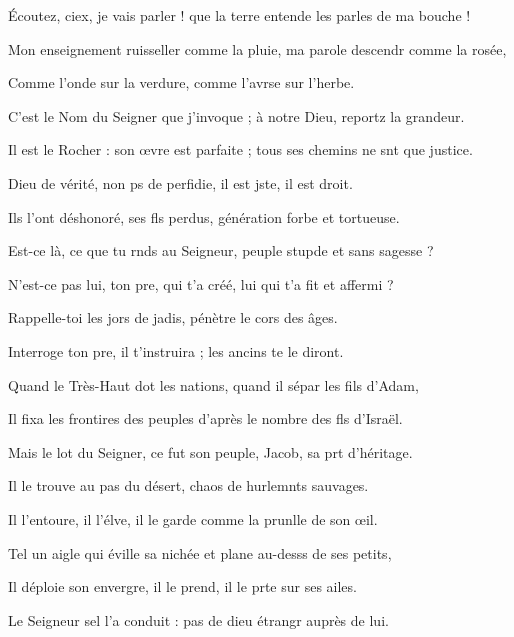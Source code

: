 \item Écoutez, ciex, je vais parler !\psstar{} que la terre entende les parles de ma bouche !
\item Mon enseignement ruisseller comme la pluie,\psstar{} ma parole descendr comme la rosée,
\item Comme l’onde sur la verdure,\psstar{} comme l’avrse sur l’herbe.
\item C’est le Nom du Seigner que j’invoque ;\psstar{} à notre Dieu, reportz la grandeur.
\item Il est le Rocher : son œvre est parfaite ;\psstar{} tous ses chemins ne snt que justice.
\item Dieu de vérité, non ps de perfidie,\psstar{} il est jste, il est droit.
\item Ils l’ont déshonoré, ses fls perdus,\psstar{} génération forbe et tortueuse.
\item Est-ce là, ce que tu rnds au Seigneur,\psstar{} peuple stupde et sans sagesse ?
\item N’est-ce pas lui, ton pre, qui t’a créé,\psstar{} lui qui t’a fit et affermi ?
\item Rappelle-toi les jors de jadis,\psstar{} pénètre le cors des âges.
\item Interroge ton pre, il t’instruira ;\psstar{} les ancins te le diront.
\item Quand le Très-Haut dot les nations,\psstar{} quand il sépar les fils d’Adam,
\item Il fixa les frontires des peuples\psstar{} d’après le nombre des fls d’Israël.
\item Mais le lot du Seigner, ce fut son peuple,\psstar{} Jacob, sa prt d’héritage.
\item Il le trouve au pas du désert,\psstar{} chaos de hurlemnts sauvages.
\item Il l’entoure, il l’élve, il le garde\psstar{} comme la prunlle de son œil.
\item Tel un aigle qui éville sa nichée\psstar{} et plane au-desss de ses petits,
\item Il déploie son envergre, il le prend,\psstar{} il le prte sur ses ailes.
\item Le Seigneur sel l’a conduit :\psstar{} pas de dieu étrangr auprès de lui.

